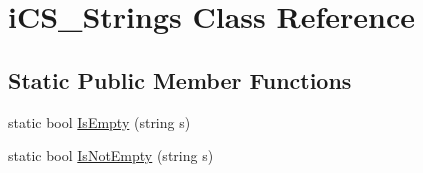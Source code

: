 \hypertarget{classi_c_s___strings}{\section{i\+C\+S\+\_\+\+Strings Class Reference}
\label{classi_c_s___strings}
}
\subsection*{Static Public Member Functions}
\begin{DoxyCompactItemize}
\item 
static bool \hyperlink{classi_c_s___strings_a954814fe9b8bae25689532eb164a800f}{Is\+Empty} (string s)
\item 
static bool \hyperlink{classi_c_s___strings_a90afd2ad37e7fe9f6ffcbb30eeb9aa36}{Is\+Not\+Empty} (string s)
\end{DoxyCompactItemize}
